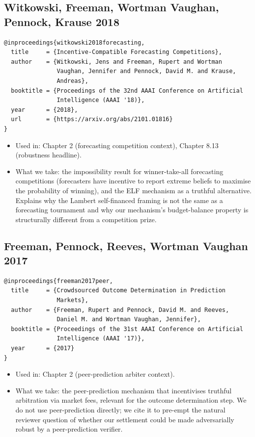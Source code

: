 \documentclass[11pt,a4paper,openany]{report}
\begin{document}
\subsection{Witkowski, Freeman, Wortman Vaughan, Pennock, Krause 2018}

\begin{verbatim}
@inproceedings{witkowski2018forecasting,
  title     = {Incentive-Compatible Forecasting Competitions},
  author    = {Witkowski, Jens and Freeman, Rupert and Wortman
               Vaughan, Jennifer and Pennock, David M. and Krause,
               Andreas},
  booktitle = {Proceedings of the 32nd AAAI Conference on Artificial
               Intelligence (AAAI '18)},
  year      = {2018},
  url       = {https://arxiv.org/abs/2101.01816}
}
\end{verbatim}

\begin{itemize}
  \item Used in: Chapter 2 (forecasting competition context), Chapter 8.13
    (robustness headline).
  \item What we take: the impossibility result for winner-take-all
    forecasting competitions (forecasters have incentive to report
    extreme beliefs to maximise the probability of winning), and the
    ELF mechanism as a truthful alternative. Explains why the Lambert
    self-financed framing is not the same as a forecasting tournament
    and why our mechanism's budget-balance property is structurally
    different from a competition prize.
\end{itemize}

\subsection{Freeman, Pennock, Reeves, Wortman Vaughan 2017}

\begin{verbatim}
@inproceedings{freeman2017peer,
  title     = {Crowdsourced Outcome Determination in Prediction
               Markets},
  author    = {Freeman, Rupert and Pennock, David M. and Reeves,
               Daniel M. and Wortman Vaughan, Jennifer},
  booktitle = {Proceedings of the 31st AAAI Conference on Artificial
               Intelligence (AAAI '17)},
  year      = {2017}
}
\end{verbatim}

\begin{itemize}
  \item Used in: Chapter 2 (peer-prediction arbiter context).
  \item What we take: the peer-prediction mechanism that incentivises
    truthful arbitration via market fees, relevant for the outcome
    determination step. We do not use peer-prediction directly; we cite
    it to pre-empt the natural reviewer question of whether our
    settlement could be made adversarially robust by a peer-prediction
    verifier.
\end{itemize}
\end{document}
